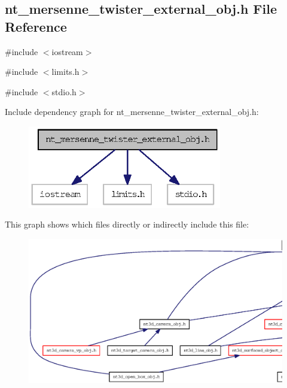 \subsection{nt\_\-mersenne\_\-twister\_\-external\_\-obj.h File Reference}
\label{nt__mersenne__twister__external__obj_8h}
{\ttfamily \#include $<$iostream$>$}\par
{\ttfamily \#include $<$limits.h$>$}\par
{\ttfamily \#include $<$stdio.h$>$}\par
Include dependency graph for nt\_\-mersenne\_\-twister\_\-external\_\-obj.h:
\nopagebreak
\begin{figure}[H]
\begin{center}
\leavevmode
\includegraphics[width=240pt]{nt__mersenne__twister__external__obj_8h__incl}
\end{center}
\end{figure}
This graph shows which files directly or indirectly include this file:
\nopagebreak
\begin{figure}[H]
\begin{center}
\leavevmode
\includegraphics[width=400pt]{nt__mersenne__twister__external__obj_8h__dep__incl}
\end{center}
\end{figure}
